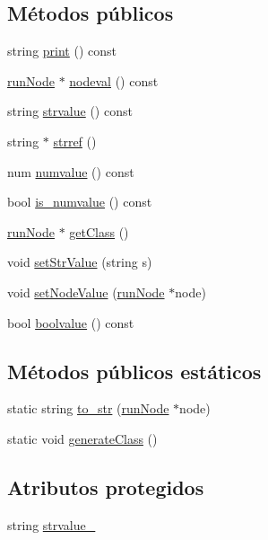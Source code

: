 \subsection*{Métodos públicos}
\begin{DoxyCompactItemize}
\item 
string \hyperlink{classstringNode_a28cd0e5daa43661788e8f0660140991a}{print} () const 
\item 
\hyperlink{classrunNode}{run\-Node} $\ast$ \hyperlink{classstringNode_a74056d81ccff202bb0b9937b35754bac}{nodeval} () const 
\item 
string \hyperlink{classstringNode_adbc47d59c690cbd5a231d9a44384e1ba}{strvalue} () const 
\item 
string $\ast$ \hyperlink{classstringNode_a75852c89ba104d54a86a821ff3ddf226}{strref} ()
\item 
num \hyperlink{classstringNode_ae66cab7ddc65acc8541d88baaebf47fb}{numvalue} () const 
\item 
bool \hyperlink{classstringNode_a4d9cd113086d5599cbd895da5b2cfb7d}{is\-\_\-numvalue} () const 
\item 
\hyperlink{classrunNode}{run\-Node} $\ast$ \hyperlink{classstringNode_a9677c9a0529af401efad50376c7f0a78}{get\-Class} ()
\item 
void \hyperlink{classstringNode_a3671dc0b4f5b6a91306095338bd0010b}{set\-Str\-Value} (string s)
\item 
void \hyperlink{classstringNode_af8d6ed0d5b9be3db1c7be9a905c25f67}{set\-Node\-Value} (\hyperlink{classrunNode}{run\-Node} $\ast$node)
\item 
bool \hyperlink{classstringNode_ae1fe6ea419679a0a0402beb47fabcea2}{boolvalue} () const 
\end{DoxyCompactItemize}
\subsection*{Métodos públicos estáticos}
\begin{DoxyCompactItemize}
\item 
static string \hyperlink{classstringNode_ae2758536a67c5d8de820331945f2d1fd}{to\-\_\-str} (\hyperlink{classrunNode}{run\-Node} $\ast$node)
\item 
static void \hyperlink{classstringNode_a41104e730bd5bf34b46c227d0cf5e0d9}{generate\-Class} ()
\end{DoxyCompactItemize}
\subsection*{Atributos protegidos}
\begin{DoxyCompactItemize}
\item 
string \hyperlink{classstringNode_a12b6d153d3484e73282fd4b939546e8b}{strvalue\-\_\-}
\end{DoxyCompactItemize}


